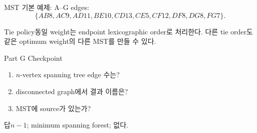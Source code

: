 \begin{frame}{MST 기본 예제: A--G}
\small edges:
\[
\{AB8,AC9,AD11,BE10,CD13,CE5,CF12,DF8,DG8,FG7\}.
\]
\begin{block}{Tie policy}동일 weight는 endpoint lexicographic order로 처리한다. 다른 tie order도 같은 optimum weight의 다른 MST를 만들 수 있다.\end{block}
\end{frame}
\begin{frame}{Part G Checkpoint}
\begin{enumerate}\item \(n\)-vertex spanning tree edge 수는?\item disconnected graph에서 결과 이름은?\item MST에 source가 있는가?\end{enumerate}
\begin{exampleblock}{답}\(n-1\); minimum spanning forest; 없다.\end{exampleblock}
\end{frame}
